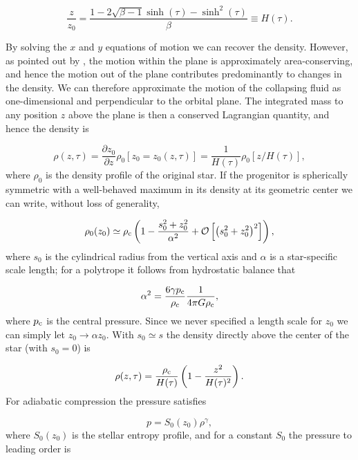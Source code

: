 \documentclass[twocolumn]{aastex62}
\begin{document}
\begin{equation}
\frac{z}{z_0} = \frac{1-2\sqrt{\beta-1}\sinh(\tau)-\sinh^2\left(\tau\right)}{\beta} \equiv H(\tau). \label{Heq}
\end{equation}

By solving the $x$ and $y$ equations of motion we can recover the density. However, as pointed out by \citet{carter83}, the motion within the plane is approximately area-conserving, and hence the motion out of the plane contributes predominantly to changes in the density. We can therefore approximate the motion of the collapsing fluid as one-dimensional and perpendicular to the orbital plane. The integrated mass to any position $z$ above the plane is then a conserved Lagrangian quantity, and hence the density is

\begin{equation}
\rho(z,\tau) = \frac{\partial z_0}{\partial z}\rho_0\left[z_0 = z_0(z,\tau)\right] = \frac{1}{H(\tau)}\rho_0\left[{z}/{H(\tau)}\right],
\end{equation}
where $\rho_0$ is the density profile of the original star. If the progenitor is spherically symmetric with a well-behaved maximum in its density at its geometric center we can write, without loss of generality, %

\begin{equation}
\rho_0(z_0) \simeq \rho_{\rm c}\left(1-\frac{s_0^2+z_0^2}{\alpha^2}+\mathcal{O}\left[\left(s_0^2+z_0^2\right)^2\right]\right), 
\end{equation}
where $s_0$ is the cylindrical radius from the vertical axis and $\alpha$ is a star-specific scale length; for a polytrope it follows from hydrostatic balance that

\begin{equation}
\alpha^2 = \frac{6\gamma p_{\rm c}}{\rho_{\rm c}}\frac{1}{4\pi G\rho_{\rm c}}, \label{alphaeq}
\end{equation} 
where $p_{\rm c}$ is the central pressure. Since {we never specified a length scale for $z_0$} we can simply let $z_0 \rightarrow \alpha z_0$. With $s_0 \simeq s$ the density directly above the center of the star (with $s_0 = 0$) is

\begin{equation}
\rho(z,\tau) = \frac{\rho_{\rm c}}{H(\tau)}\left(1-\frac{z^2}{H(\tau)^2}\right). \label{rhoz}
\end{equation}
For adiabatic compression the pressure satisfies

\begin{equation}
p = S_0(z_0)\rho^{\gamma},
\end{equation}
where $S_0(z_0)$ is the stellar entropy profile, and for a constant $S_0$ the pressure to leading order is
\end{document}
